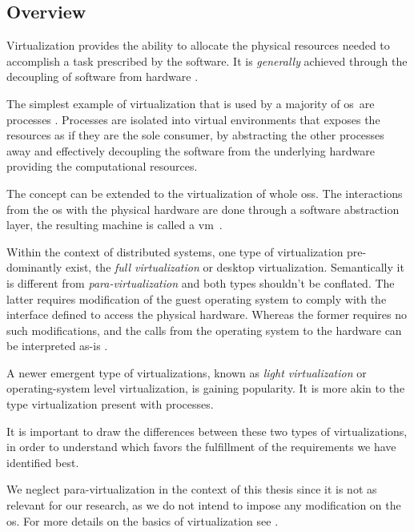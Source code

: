 \documentclass[12pt, titlepage]{uo_temp}
\begin{document}
     \subsection{Overview}
     Virtualization provides the ability to
     allocate the physical resources needed to accomplish a task prescribed by the software.
     It is \emph{generally} achieved through the decoupling of software from hardware
     \cite{tavangarian2012virtual}.

     The simplest example of virtualization that is used by a majority of \gls{os}\ are
     processes \cite{chisnall2008definitive}. Processes are isolated into virtual
     environments that exposes the resources as if they are the sole consumer, by
     abstracting the other processes away and effectively decoupling the software from the
     underlying hardware providing the computational resources.

     The concept can be extended to the virtualization of whole \gls{os}s. The
     interactions from the \gls{os} with the physical hardware are done through a software
     abstraction layer, the resulting machine is called a \gls{vm}\
     \cite{semnanian2011virtualization}.

     Within the context of distributed systems, one type of virtualization pre-dominantly
     exist, the \emph{full virtualization} or desktop virtualization. Semantically it is
     different from \emph{para-virtualization} and both types shouldn't be conflated. The
     latter requires modification of the guest operating system to comply with the
     interface defined to access the physical hardware. Whereas the former requires no
     such modifications, and the calls from the operating system to the hardware can be
     interpreted as-is \cite{tavangarian2012virtual}.

     A newer emergent type of virtualizations, known as \emph{light virtualization} or
     operating-system level virtualization, is gaining popularity. It is more akin to
     the type virtualization present with processes. 
   
     It is important to draw the differences between these two types of virtualizations,
     in order to understand which favors the fulfillment of the requirements we have
     identified best.
     
     We neglect para-virtualization in the context of this thesis since it is not as
     relevant for our research, as we do not intend to impose any modification on the
     \gls{os}. For more details on the basics of virtualization see
     \cite{tavangarian2012virtual} \cite{barham2003xen}.
  
\end{document}

